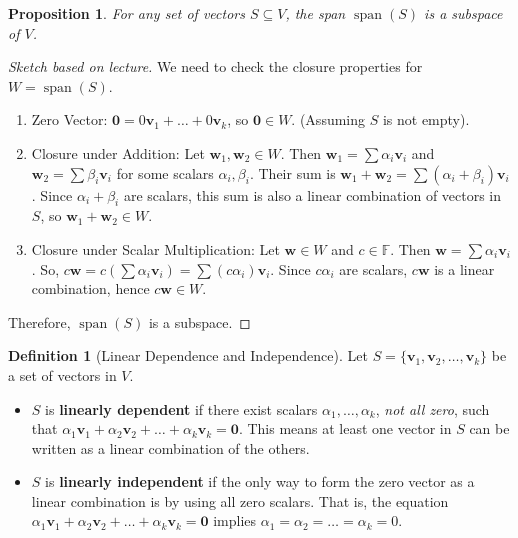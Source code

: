 \documentclass[11pt]{article}
\newtheorem{proposition}[theorem]{Proposition}
\theoremstyle{definition}
\newtheorem{definition}[theorem]{Definition}
\theoremstyle{remark}
\newcommand{\F}{\mathbb{F}}
\newcommand{\Span}{\operatorname{span}}
\begin{document}
\begin{proposition}
For any set of vectors $S \subseteq V$, the span $\Span(S)$ is a subspace of $V$.
\end{proposition}
\begin{proof}[Sketch based on lecture]
We need to check the closure properties for $W = \Span(S)$.
\begin{enumerate}
    \item Zero Vector: $\mathbf{0} = 0\mathbf{v}_1 + \dots + 0\mathbf{v}_k$, so $\mathbf{0} \in W$. (Assuming $S$ is not empty).
    \item Closure under Addition: Let $\mathbf{w}_1, \mathbf{w}_2 \in W$. Then $\mathbf{w}_1 = \sum \alpha_i \mathbf{v}_i$ and $\mathbf{w}_2 = \sum \beta_i \mathbf{v}_i$ for some scalars $\alpha_i, \beta_i$. Their sum is $\mathbf{w}_1 + \mathbf{w}_2 = \sum (\alpha_i + \beta_i) \mathbf{v}_i$. Since $\alpha_i + \beta_i$ are scalars, this sum is also a linear combination of vectors in $S$, so $\mathbf{w}_1 + \mathbf{w}_2 \in W$.
    \item Closure under Scalar Multiplication: Let $\mathbf{w} \in W$ and $c \in \F$. Then $\mathbf{w} = \sum \alpha_i \mathbf{v}_i$. So, $c\mathbf{w} = c(\sum \alpha_i \mathbf{v}_i) = \sum (c\alpha_i) \mathbf{v}_i$. Since $c\alpha_i$ are scalars, $c\mathbf{w}$ is a linear combination, hence $c\mathbf{w} \in W$.
\end{enumerate}
Therefore, $\Span(S)$ is a subspace.
\end{proof}

\begin{definition}[Linear Dependence and Independence]
Let $S = \{\mathbf{v}_1, \mathbf{v}_2, \dots, \mathbf{v}_k\}$ be a set of vectors in $V$.
\begin{itemize}
    \item $S$ is \textbf{linearly dependent} if there exist scalars $\alpha_1, \dots, \alpha_k$, \textit{not all zero}, such that $\alpha_1 \mathbf{v}_1 + \alpha_2 \mathbf{v}_2 + \dots + \alpha_k \mathbf{v}_k = \mathbf{0}$. This means at least one vector in $S$ can be written as a linear combination of the others.
    \item $S$ is \textbf{linearly independent} if the only way to form the zero vector as a linear combination is by using all zero scalars. That is, the equation $\alpha_1 \mathbf{v}_1 + \alpha_2 \mathbf{v}_2 + \dots + \alpha_k \mathbf{v}_k = \mathbf{0}$ implies $\alpha_1 = \alpha_2 = \dots = \alpha_k = 0$.
\end{itemize}
\end{definition}
\end{document}
